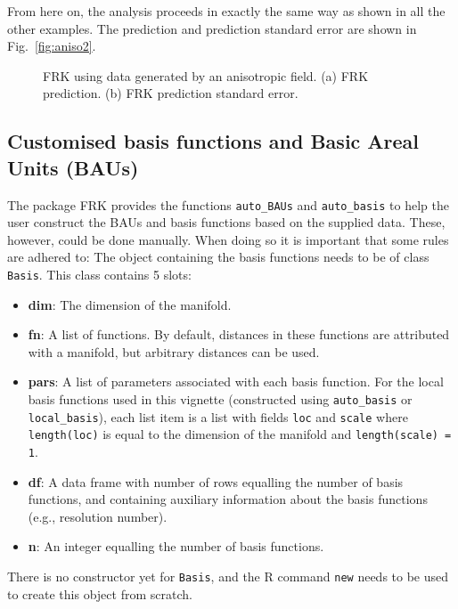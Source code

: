 \documentclass{article}\usepackage[]{graphicx}\usepackage[]{color}
\newenvironment{knitrout}{}{} %
\renewcommand{\tt} {\texttt}
\newcommand{\pkg}[1]{{\fontseries{b}\selectfont #1}}
\let\proglang=\textsf
\begin{document}
From here on, the analysis proceeds in exactly the same way as shown in all the other examples. The prediction and prediction standard error are shown in Fig.~\ref{fig:aniso2}.



\begin{knitrout}
\color{fgcolor}\begin{figure}[t]
\caption{FRK using data generated by an anisotropic field. (a) FRK prediction. (b) FRK prediction standard error.\label{fig:aniso2}}\label{fig:unnamed-chunk-73}
\end{figure}


\end{knitrout}


\subsection{Customised basis functions and Basic Areal Units (BAUs)} \label{sec:custom_basis}

The package \pkg{FRK} provides the functions \tt{auto\_BAUs} and \tt{auto\_basis} to help the user construct the BAUs and basis functions based on the supplied data. These, however, could be done manually. When doing so it is important that some rules are adhered to: The object containing the basis functions needs to be of class \tt{Basis}. This class contains 5 slots:
\begin{itemize}
\item {\bf dim}: The dimension of the manifold.
\item {\bf fn}: A list of functions. By default, distances in these functions are attributed with a manifold, but arbitrary distances can be used.
\item {\bf pars}: A list of parameters associated with each basis function. For the local basis functions used in this vignette (constructed using \tt{auto\_basis} or \tt{local\_basis}), each list item is a list with fields \tt{loc} and \tt{scale} where \tt{length(loc)} is equal to the dimension of the manifold and \tt{length(scale) = 1}.
\item {\bf df}: A data frame with number of rows equalling the number of basis functions, and containing auxiliary information about the basis functions (e.g., resolution number).
\item {\bf n}: An integer equalling the number of basis functions.
\end{itemize}
There is no constructor yet for \tt{Basis}, and the \proglang{R} command \tt{new} needs to be used to create this object from scratch.
\end{document}
